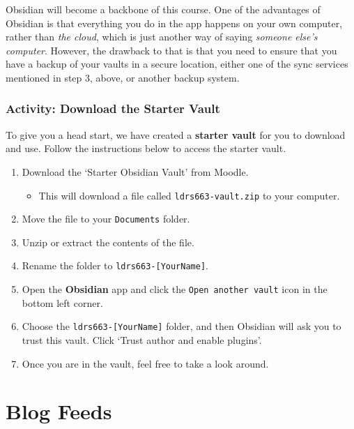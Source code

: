 \documentclass[
]{book}
\providecommand{\tightlist}{%
  \setlength{\itemsep}{0pt}\setlength{\parskip}{0pt}}
\begin{document}
Obsidian will become a backbone of this course. One of the advantages of Obsidian is that everything you do in the app happens on your own computer, rather than \emph{the cloud}, which is just another way of saying \emph{someone else's computer}. However, the drawback to that is that you need to ensure that you have a backup of your vaults in a secure location, either one of the sync services mentioned in step 3, above, or another backup system.

\hypertarget{activity-download-the-starter-vault}{%
\subsection*{Activity: Download the Starter Vault}\label{activity-download-the-starter-vault}}

\begin{reflect}
To give you a head start, we have created a \textbf{starter vault} for you to download and use. Follow the instructions below to access the starter vault.

\begin{enumerate}
\def\labelenumi{\arabic{enumi}.}
\item
  Download the `Starter Obsidian Vault' from Moodle.

  \begin{itemize}
  \tightlist
  \item
    This will download a file called \texttt{ldrs663-vault.zip} to your computer.
  \end{itemize}
\item
  Move the file to your \texttt{Documents} folder.
\item
  Unzip or extract the contents of the file.
\item
  Rename the folder to \texttt{ldrs663-{[}YourName{]}}.
\item
  Open the \textbf{Obsidian} app and click the \texttt{Open\ another\ vault} icon in the bottom left corner.
\item
  Choose the \texttt{ldrs663-{[}YourName{]}} folder, and then Obsidian will ask you to trust this vault. Click `Trust author and enable plugins'.
\item
  Once you are in the vault, feel free to take a look around.
\end{enumerate}
\end{reflect}

\hypertarget{blog-feeds}{%
\chapter*{Blog Feeds}\label{blog-feeds}}
\end{document}
